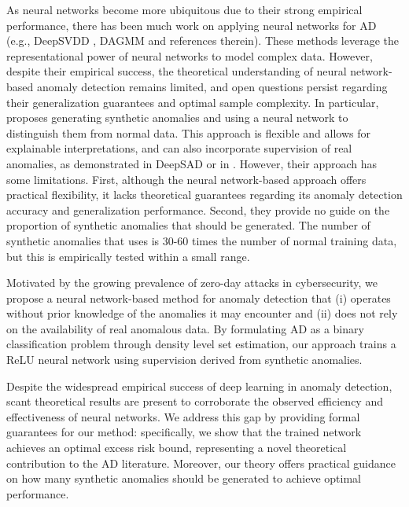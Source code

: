 \documentclass{article}
\begin{document}
As neural networks become more ubiquitous due to their strong empirical performance, there has been much work on applying neural networks for AD (e.g., DeepSVDD \citep{deep_svdd}, DAGMM \citep{zong2018deep} and references therein).
These methods leverage the representational power of neural networks to model complex data. However, despite their empirical success, the theoretical understanding of neural network-based anomaly detection remains limited, and open questions persist regarding their generalization guarantees and optimal sample complexity.
In particular, \citet{sipple20NSNN}  proposes generating synthetic anomalies and using a neural network to distinguish them from normal data. This approach is flexible and allows for explainable interpretations, and can also incorporate supervision of real anomalies, as demonstrated in DeepSAD \citep{Ruff2020DeepSAD} or in \cite{lau2024revisiting_XOR, lau2024geometric_OSR}.
However, their approach has some limitations.
First, although the neural network-based approach offers practical flexibility, it lacks theoretical guarantees regarding its anomaly detection accuracy and generalization performance.
Second, they provide no guide on the proportion of synthetic anomalies that should be generated.
The number of synthetic anomalies that \citet{sipple20NSNN} uses is 30-60 times the number of normal training data, but this is empirically tested within a small range.

Motivated by the growing prevalence of zero-day attacks in cybersecurity, we propose a neural network-based method for anomaly detection that (i) operates without prior knowledge of the anomalies it may encounter and (ii) does not rely on the availability of real anomalous data. By formulating AD as a binary classification problem through density level set estimation, our approach trains a ReLU neural network using supervision derived from synthetic anomalies.

Despite the widespread empirical success of deep learning in anomaly detection, scant theoretical results are present to corroborate the observed efficiency and effectiveness of neural networks. We address this gap by providing formal guarantees for our method: specifically, we show that the trained network achieves an optimal excess risk bound, representing a novel theoretical contribution to the AD literature. Moreover, our theory offers practical guidance on how many synthetic anomalies should be generated to achieve optimal performance.
\end{document}
